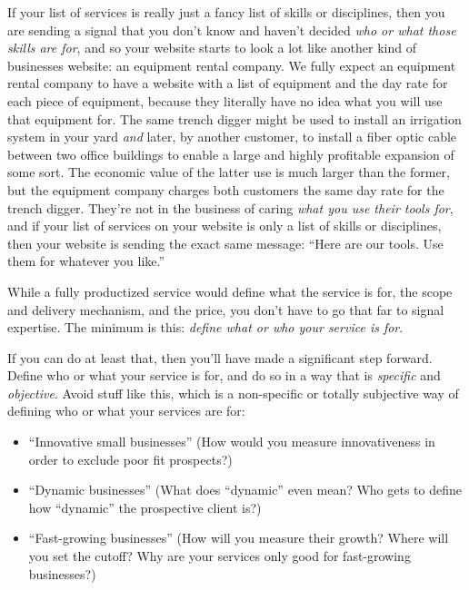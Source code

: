If your list of services is really just a fancy list of skills or disciplines, then you are sending a signal that you don't know and haven't decided \emph{who or what those skills are for}, and so your website starts to look a lot like another kind of businesses website: an equipment rental company. We fully expect an equipment rental company to have a website with a list of equipment and the day rate for each piece of equipment, because they literally have no idea what you will use that equipment for. The same trench digger might be used to install an irrigation system in your yard \emph{and} later, by another customer, to install a fiber optic cable between two office buildings to enable a large and highly profitable expansion of some sort. The economic value of the latter use is much larger than the former, but the equipment company charges both customers the same day rate for the trench digger. They're not in the business of caring \emph{what you use their tools for}, and if your list of services on your website is only a list of skills or disciplines, then your website is sending the exact same message: ``Here are our tools. Use them for whatever you like.''

While a fully productized service would define what the service is for, the scope and delivery mechanism, and the price, you don't have to go that far to signal expertise. The minimum is this: \emph{define what or who your service is for}.

If you can do at least that, then you'll have made a significant step forward. Define who or what your service is for, and do so in a way that is \emph{specific} and \emph{objective}. Avoid stuff like this, which is a non-specific or totally subjective way of defining who or what your services are for:

\begin{itemize}
\item ``Innovative small businesses'' (How would you measure innovativeness in order to exclude poor fit prospects?)
\item ``Dynamic businesses'' (What does ``dynamic'' even mean? Who gets to define how ``dynamic'' the prospective client is?)
\item ``Fast-growing businesses'' (How will you measure their growth? Where will you set the cutoff? Why are your services only good for fast-growing businesses?)
\end{itemize}

